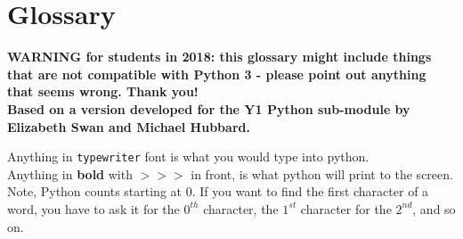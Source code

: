 
\chapter{Glossary}
\label{Glossary}

{\bf \Large WARNING for students in 2018: this glossary might include things that are not compatible with Python 3 - please point out anything that seems wrong. Thank you!}\\

{\bf Based on a version developed for the Y1 Python sub-module by Elizabeth Swan and Michael Hubbard.}\\

\linespan

\noindent
Anything in \texttt{typewriter} font is what you would type into python.\\
Anything in \textbf{bold} with $>>>$ in front, is what python will print to the screen.\\
Note, Python counts starting at 0. If you want to find the first character of a word, you have to ask it for the $0^{th}$ character, the $1^{st}$ character for the $2^{nd}$, and so on.


\linespan
